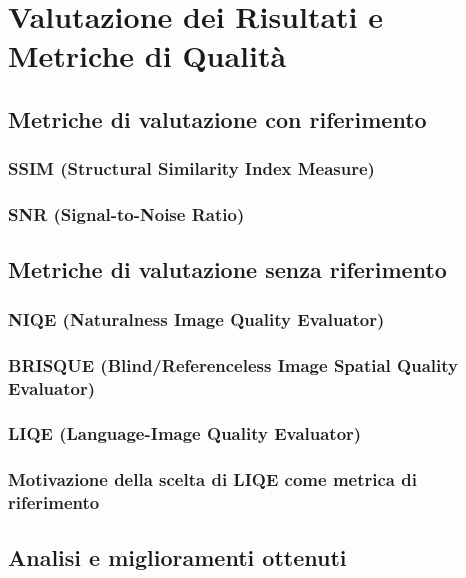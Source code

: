 \chapter{Valutazione dei Risultati e Metriche di Qualità} \label{chap:evaluation}

\section{Metriche di valutazione con riferimento} \label{sec:r_metrics}

\subsection{SSIM (Structural Similarity Index Measure)} \label{subsec:ssim}

\subsection{SNR (Signal-to-Noise Ratio)} \label{subsec:snr}

\section{Metriche di valutazione senza riferimento} \label{sec:nr_metrics}

\subsection{NIQE (Naturalness Image Quality Evaluator)} \label{subsec:niqe}

\subsection{BRISQUE (Blind/Referenceless Image Spatial Quality Evaluator)} \label{subsec:brisque}

\subsection{LIQE (Language-Image Quality Evaluator)} \label{subsec:liqe}

\subsection{Motivazione della scelta di LIQE come metrica di riferimento} \label{subsec:why_liqe}

\section{Analisi e miglioramenti ottenuti} \label{sec:analysis}

